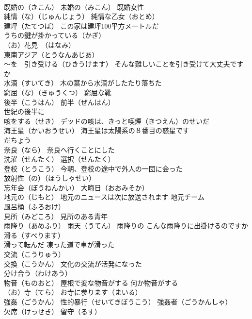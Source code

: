 \documentclass[8pt]{extreport}
\begin{document}
\begin{CJK}{UTF8}{min}
\\	既婚の（きこん） 未婚の（みこん） 既婚女性
\\	純情（な）（じゅんじょう） 純情な乙女（おとめ）
\\	建坪（たてつぼ） この家は建坪100平方メートルだ
\\	うちの鍵が掛かっている（かぎ）	
\\	（お）花見　（はなみ）
\\	東南アジア（とうなんあじあ）
\\	～を　引き受ける（ひきうけます） そんな難しいことを引き受けて大丈夫ですか
\\	水滴（すいてき） 木の葉から水滴がしたたり落ちた
\\	窮屈（な）（きゅうくつ） 窮屈な靴
\\	後半（こうはん） 前半（ぜんはん） 
\\	世紀の後半に
\\	咳をする（せき） デッドの咳は、きっと喫煙（きつえん）のせいだ
\\	海王星（かいおうせい） 海王星は太陽系の８番目の惑星です
\\	だちょう
\\	奈良（なら） 奈良へ行くことにした
\\	洗濯（せんたく） 選択（せんたく）
\\	登校（とうこう） 今朝、登校の途中で外人の一団に会った
\\	放射性（の）（ほうしゃせい）
\\	忘年会（ぼうねんかい） 大晦日（おおみそか）
\\	地元の（じもと） 地元のニュースは次に放送されます 地元チーム
\\	風呂桶（ふろおけ）
\\	見所（みどころ） 見所のある青年
\\	雨降り（あめふり） 雨天（うてん） 雨降りの こんな雨降りに出掛けるのですか
\\	滑る（すべります） 
\\	滑って転んだ 凍った道で車が滑った
\\	交流（こうりゅう）
\\	交換（こうかん） 文化の交流が活発になった
\\	分け合う（わけあう）
\\	物音（ものおと） 屋根で変な物音がする 何か物音がする
\\	（お）寺（てら） お寺に参ります（まいる）
\\	強姦（ごうかん） 性的暴行（せいてきぼうこう） 強姦者（ごうかんしゃ）
\\	欠席（けっせき） 留守（るす）

\end{CJK}
\end{document}
